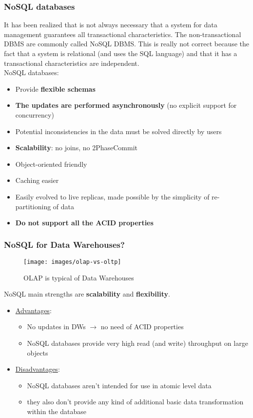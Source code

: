 \documentclass[10pt,a4paper]{article}
\begin{document}
\subsubsection{NoSQL databases}
It has been realized that is not always necessary that a system for data management guarantees all transactional characteristics. The non-transactional DBMS are commonly called NoSQL DBMS. This is really not correct because the fact that a system is relational (and uses the SQL language) and that it has a transactional characteristics are independent. \\
NoSQL databases:
\begin{itemize}
	\item Provide \textbf{flexible schemas}
	\item \textbf{The updates are performed asynchronously} (no explicit support for concurrency)
	\item Potential inconsistencies in the data must be solved directly by users
	\item \textbf{Scalability}: no joins, no 2PhaseCommit
	\item Object-oriented friendly
	\item Caching easier
	\item Easily evolved to live replicas, made possible by the simplicity of re-partitioning of data
	\item \textbf{Do not support all the ACID properties}
\end{itemize}
\pagebreak
\subsubsection{NoSQL for Data Warehouses?}
\begin{figure}[htp]
\centering
\texttt{[image: images/olap-vs-oltp]}\hfill
\caption{OLAP is typical of Data Warehouses}
\end{figure}
NoSQL main strengths are \textbf{scalability} and \textbf{flexibility}.
\begin{itemize}
	\item \uline{Advantages}:
	\begin{itemize}
		\item No updates in DWs $\rightarrow$ no need of ACID properties
		\item NoSQL databases provide very high read (and write) throughput on large objects
	\end{itemize}
	\item \uline{Disadvantages}:
	\begin{itemize}
		\item NoSQL databases aren't intended for use in atomic level data
		\item they also don't provide any kind of additional basic data transformation within the database
	\end{itemize}
\end{itemize}
\end{document}
